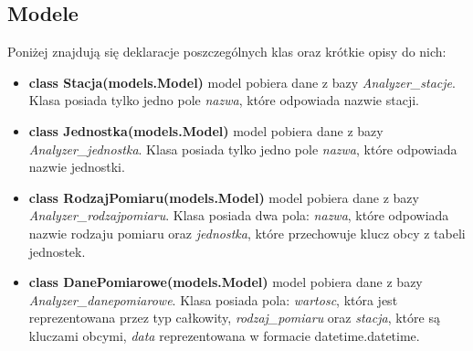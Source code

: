 \subsection{Modele}
Poniżej znajdują się deklaracje poszczególnych klas oraz krótkie opisy do nich:
\begin{itemize}
	\item \textbf{class Stacja(models.Model)} \newline
	model pobiera dane z bazy \textit{Analyzer\_stacje}.
	Klasa posiada tylko jedno pole \textit{nazwa}, które odpowiada nazwie stacji.
	\item \textbf{class Jednostka(models.Model)} \newline
	model pobiera dane z bazy \textit{Analyzer\_jednostka}.
	Klasa posiada tylko jedno pole \textit{nazwa}, które odpowiada nazwie jednostki.
	\item \textbf{class RodzajPomiaru(models.Model)} \newline
	model pobiera dane z bazy \textit{Analyzer\_rodzajpomiaru}.
	Klasa posiada dwa pola: \textit{nazwa}, które odpowiada nazwie rodzaju pomiaru oraz \textit{jednostka}, które przechowuje klucz obcy z tabeli jednostek. 
	\item \textbf{class DanePomiarowe(models.Model)} \newline
	model pobiera dane z bazy \textit{Analyzer\_danepomiarowe}.
	Klasa posiada pola: \textit{wartosc}, która jest reprezentowana przez typ całkowity, \textit{rodzaj\_pomiaru} oraz \textit{stacja}, które są kluczami obcymi, \textit{data} reprezentowana w formacie datetime.datetime.
\end{itemize}

